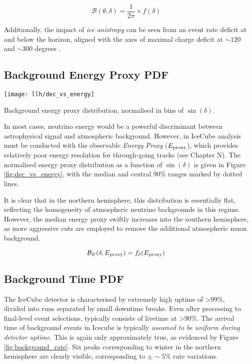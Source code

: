 \begin{equation}
\mathcal{B} (\theta, \delta) = \frac{1}{2\pi} \times f(\delta)
\end{equation}


Additionally, the impact of \emph{ice anistropy} can be seen from an event rate deficit at and below the horizon, aligned with the axes of maximal charge deficit at $\sim 120$ and $\sim 300$ degrees .

\subsection{Background Energy Proxy PDF}


\begin{marginfigure}
	\centering \texttt{[image: llh/dec\_vs\_energy]}
	\caption{Background energy proxy distribution, normalised in bins of $\sin(\delta)$.}
	\label{fig:dec_vs_energy}
\end{marginfigure}

In most cases, neutrino energy would be a powerful discriminant between astrophysical signal and atmospheric background. However, in IceCube analysis must be conducted with the observable \emph{Energy Proxy}  ($E_{\textup{proxy}}$), which provides relatively poor energy resolution for through-going tracks (see Chapter N). The normalised energy proxy distribution as a function of $\sin(\delta)$ is given in Figure \ref{fig:dec_vs_energy}, with the median and central 90\% ranges marked by dotted lines. 

It is clear that in the northern hemisphere, this distribution is essentially flat, reflecting the homogeneity of atmospheric neutrino backgrounds in this regime. However, the median energy proxy swiftly increases into the southern hemisphere, as more aggressive cuts are employed to remove the additional atmospheric muon background.

\begin{equation}
\mathcal{B}_{E} (\delta, E_{\textup{proxy}}) = f_{\delta}(E_{\textup{proxy}})
\end{equation}

\subsection{Background Time PDF}

The IceCube detector is characterised by extremely high uptime of >99\%, divided into runs separated by small downtime breaks. Even after processing to final-level event selections, typically consists of livetime at >90\%. The arrival time of background events in Icecube is typically \emph{assumed to be uniform during detector uptime}. This is again only approximately true, as evidenced by Figure \ref{fig:background_rate}.  Six peaks corresponding to winter in the northern hemisphere are clearly visible, corresponding to $\pm \sim5\%$ rate variations.


